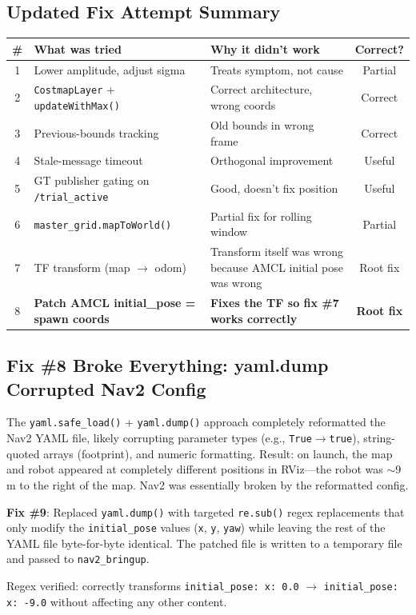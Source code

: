 \documentclass[11pt]{article}
\newcommand{\logentry}[1]{\subsection*{#1}}
\begin{document}
\logentry{Updated Fix Attempt Summary}
\begin{center}
\begin{tabular}{|c|p{5cm}|p{4cm}|c|}
\hline
\textbf{\#} & \textbf{What was tried} & \textbf{Why it didn't work} & \textbf{Correct?} \\
\hline
1 & Lower amplitude, adjust sigma & Treats symptom, not cause & Partial \\
\hline
2 & \texttt{CostmapLayer} + \texttt{updateWithMax()} & Correct architecture, wrong coords & Correct \\
\hline
3 & Previous-bounds tracking & Old bounds in wrong frame & Correct \\
\hline
4 & Stale-message timeout & Orthogonal improvement & Useful \\
\hline
5 & GT publisher gating on \texttt{/trial\_active} & Good, doesn't fix position & Useful \\
\hline
6 & \texttt{master\_grid.mapToWorld()} & Partial fix for rolling window & Partial \\
\hline
7 & TF transform (map $\to$ odom) & Transform itself was wrong because AMCL initial pose was wrong & Root fix \\
\hline
8 & \textbf{Patch AMCL initial\_pose = spawn coords} & \textbf{Fixes the TF so fix \#7 works correctly} & \textbf{Root fix} \\
\hline
\end{tabular}
\end{center}

\logentry{Fix \#8 Broke Everything: yaml.dump Corrupted Nav2 Config}
The \texttt{yaml.safe\_load()} + \texttt{yaml.dump()} approach completely
reformatted the Nav2 YAML file, likely corrupting parameter types (e.g.,
\texttt{True}$\to$\texttt{true}), string-quoted arrays (footprint), and
numeric formatting. Result: on launch, the map and robot appeared at completely
different positions in RViz---the robot was $\sim$9\,m to the right of the map.
Nav2 was essentially broken by the reformatted config.

\textbf{Fix \#9}: Replaced \texttt{yaml.dump()} with targeted \texttt{re.sub()}
regex replacements that only modify the \texttt{initial\_pose} values
(\texttt{x}, \texttt{y}, \texttt{yaw}) while leaving the rest of the YAML file
byte-for-byte identical. The patched file is written to a temporary file and
passed to \texttt{nav2\_bringup}.

Regex verified: correctly transforms
\texttt{initial\_pose: x: 0.0} $\to$ \texttt{initial\_pose: x: -9.0} without
affecting any other content.
\end{document}
